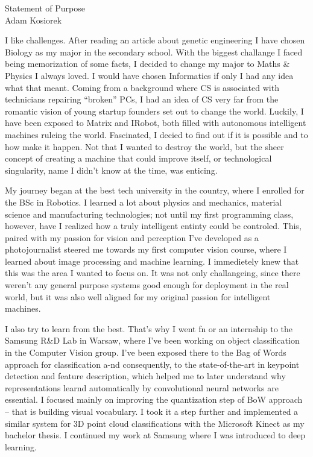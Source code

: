 \documentclass[12pt]{article}
\begin{document}
\begin{center}
{\Large Statement of Purpose} \\[.3in]
{\large Adam Kosiorek}
\end{center}

\vspace*{.5in}

I like challenges. After reading an article about genetic engineering I have chosen Biology as my major in the secondary school. With the biggest challange I faced being memorization of some facts, I decided to change my major to Maths \& Physics I always loved. I would have chosen Informatics if only I had any idea what that meant. Coming from a background where CS is associated with technicians repairing “broken” PCs, I had an idea of CS very far from the romantic vision of young startup founders set out to change the world. Luckily, I have been exposed to Matrix and IRobot, both filled with autonomous intelligent machines ruleing the world. Fascinated, I decied to find out if it is possible and to how make it happen. Not that I wanted to destroy the world, but the sheer concept of creating a machine that could improve itself, or technological singularity, name I didn't know at the time, was enticing. 

My journey began at the best tech university in the country, where I enrolled for the BSc in Robotics. I learned a lot about physics and mechanics, material science and manufacturing technologies; not until my first programming class, however, have I realized how a truly intelligent entinty could be controled. This, paired with my passion for vision and perception I've developed as a photojournalist steered me towards my first computer vision course, where I learned about image processing and machine learning. I immedietely knew that this was the area I wanted to focus on. It was not only challangeing, since there weren't any general purpose systems good enough for deployment in the real world, but it was also well aligned for my original passion for intelligent machines.

I also try to learn from the best. That's why I went fn or an internship to the Samsung R\&D Lab in Warsaw, where I've been working on object classification in the Computer Vision group. I've been exposed there to the Bag of Words approach for classification a-nd consequently, to the state-of-the-art in keypoint detection and feature description, which helped me to later understand why representations learnd automatically by convolutional neural networks are essential. I focused mainly on improving the quantization step of BoW approach – that is building visual vocabulary. I took it a step further and implemented a similar system for 3D point cloud classifications with the Microsoft Kinect as my bachelor thesis. I continued my work at Samsung where I was introduced to deep learning.
\end{document}
